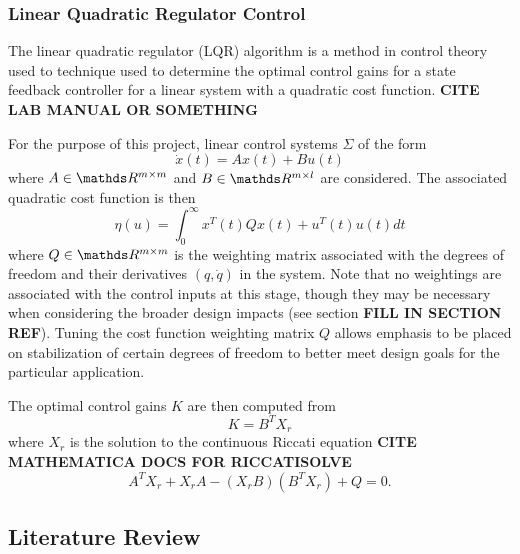 \subsubsection{Linear Quadratic Regulator Control}
The linear quadratic regulator (LQR) algorithm is a method in control theory used to technique used to determine the optimal control gains for a state feedback controller for a linear system with a quadratic cost function. \textbf{CITE LAB MANUAL OR SOMETHING}

For the purpose of this project, linear control systems $\Sigma$ of the form
\begin{equation}
\dot{x}(t) = Ax(t) + Bu(t)
\end{equation}
where $A \in \R^{m \times m}$ and $B \in \R^{m \times l}$ are considered.
The associated quadratic cost function is then 
\begin{equation}
\eta(u) = \int_{0}^{\infty}x^{T}(t)Qx(t)+u^{T}(t)u(t)dt
\end{equation}
where $Q \in \R^{m \times m}$ is the weighting matrix associated with the degrees of freedom and their derivatives $(q, \dot{q})$ in the system. Note that no weightings are associated with the control inputs at this stage, though they may be necessary when considering the broader design impacts (see section \textbf{FILL IN SECTION REF}). Tuning the cost function weighting matrix $Q$ allows emphasis to be placed on stabilization of certain degrees of freedom to better meet design goals for the particular application.

The optimal control gains $K$ are then computed from
\begin{equation}
K = B^{T}X_{r}
\end{equation}
where  $X_{r}$ is the solution to the continuous Riccati equation \textbf{CITE MATHEMATICA DOCS FOR RICCATISOLVE}
\begin{equation}
A^{T}X_{r} + X_{r}A - (X_{r}B)(B^{T}X_{r}) + Q = 0.
\end{equation}

\subsection{Literature Review}
